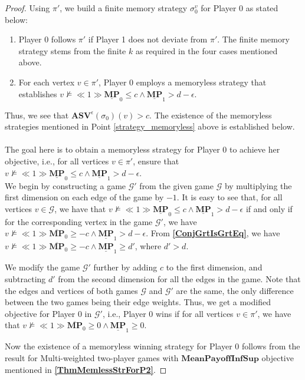 \begin{proof}
Using $\pi'$, we build a finite memory strategy $\sigma_0^v$ for Player 0 as stated below:
\begin{enumerate}
    \item Player 0 follows $\pi'$ if Player 1 does not deviate from $\pi'$. The finite memory strategy stems from the finite $k$ as required in the four cases mentioned above.
    \item \label{strategy_memoryless} For each vertex $v \in \pi'$, Player 0 employs a memoryless strategy that establishes $v \nvDash \ll 1 \gg \underline{\mathbf{MP}}_0 \leqslant c \land \underline{\mathbf{MP}}_1 > d-\epsilon$.
\end{enumerate}
Thus, we see that $\mathbf{ASV}^{\epsilon}(\sigma_0)(v) > c$.
The existence of the memoryless strategies mentioned in Point \ref{strategy_memoryless} above is established below. \\ \\ \noindent
The goal here is to obtain a memoryless strategy for Player 0 to achieve her objective, i.e., for all vertices $v \in \pi'$, ensure that $v \nvDash \ll 1 \gg \underline{\mathbf{MP}}_0 \leqslant c \land \underline{\mathbf{MP}}_1 > d-\epsilon$. \\ \noindent
We begin by constructing a game $\mathcal{G'}$ from the given game $\mathcal{G}$ by multiplying the first dimension on each edge of the game by $-1$. It is easy to see that, for all vertices $v \in \mathcal{G}$, we have that $v \nvDash \ll 1 \gg \underline{\mathbf{MP}}_0 \leqslant c \land \underline{\mathbf{MP}}_1 > d-\epsilon$ if and only if for the corresponding vertex in the game $\mathcal{G'}$, we have $v \nvDash \ll 1 \gg \overline{\mathbf{MP}}_0 \geqslant -c \land \underline{\mathbf{MP}}_1 > d-\epsilon$.
From \textbf{\cref{ConjGrtIsGrtEq}}, we have $v \nvDash \ll 1 \gg \overline{\mathbf{MP}}_0 \geqslant -c \land \underline{\mathbf{MP}}_1 \geqslant d'$, where $d' > d$.

We modify the game $\mathcal{G'}$ further by adding $c$ to the first dimension, and subtracting $d'$ from the second dimension for all the edges in the game. Note that the edges and vertices of both games $\mathcal{G}$ and $\mathcal{G'}$ are the same, the only difference between the two games being their edge weights. Thus, we get a modified objective for Player 0 in $\mathcal{G'}$, i.e., Player 0 wins if for all vertices $v \in \pi'$, we have that $v \nvDash \ll 1 \gg \overline{\mathbf{MP}}_0 \geqslant 0 \land \underline{\mathbf{MP}}_1 \geqslant 0$.

Now the existence of a memoryless winning strategy for Player 0 follows from the result for Multi-weighted two-player games with $\mathbf{MeanPayoffInfSup}$ objective \cite{VCDHRR15} mentioned in \textbf{\cref{ThmMemlessStrForP2}}.


\end{proof}
